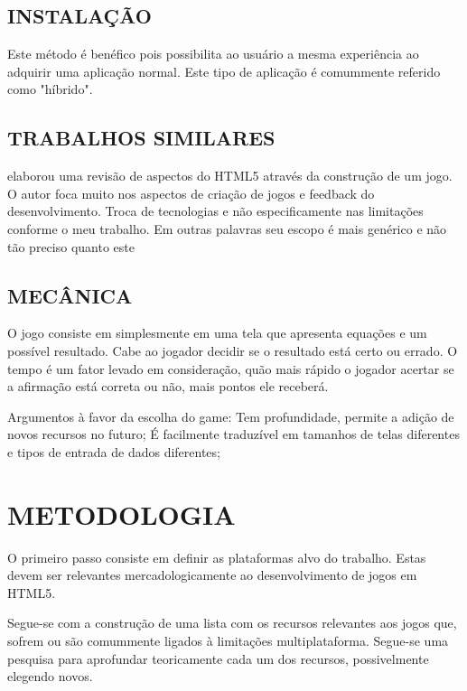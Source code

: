 \documentclass[
12pt,
a4paper,
portuges,
draft
]{report}
\begin{document}
\section{INSTALAÇÃO}
Este método é benéfico pois possibilita ao usuário a mesma
experiência ao adquirir uma aplicação normal. Este tipo de
aplicação é comummente referido como "híbrido".

\section{TRABALHOS SIMILARES}

\cite{crossPlatformMobileGame} elaborou uma revisão de aspectos do
HTML5 através da construção de um jogo. O autor foca muito nos
aspectos de criação de jogos e feedback do desenvolvimento. Troca
de tecnologias e não especificamente nas limitações conforme o meu
trabalho. Em outras palavras seu escopo é mais genérico e não tão
preciso quanto este


\section{MECÂNICA}

O jogo consiste em simplesmente em uma tela que apresenta equações e
um possível resultado. Cabe ao jogador decidir se o resultado está
certo ou errado. O tempo é um fator levado em consideração, quão
mais rápido o jogador acertar se a afirmação está correta ou não,
mais pontos ele receberá.

Argumentos à favor da escolha do game: Tem profundidade, permite a
adição de novos recursos no futuro;
É facilmente traduzível em tamanhos de telas diferentes e tipos de
entrada de dados diferentes;

\chapter{METODOLOGIA}
\thispagestyle{myheadings}

O primeiro passo consiste em definir as plataformas alvo do trabalho.
Estas devem ser relevantes mercadologicamente ao desenvolvimento de jogos em HTML5.

Segue-se com a construção de uma lista com os recursos relevantes
aos jogos que, sofrem ou são comummente ligados à
limitações multiplataforma. Segue-se uma pesquisa para aprofundar
teoricamente cada um dos recursos, possivelmente elegendo novos.
\end{document}
